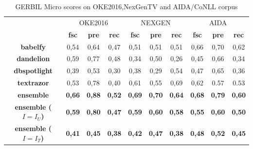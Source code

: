 \documentclass{llncs}
\begin{document}
\begin{table}
      \centering
      \setlength{\tabcolsep}{5pt}
        \begin{tabular}{c|c|c|c|c|c|c|c|c|c|}
          \multicolumn{1}{c}{ } &
          \multicolumn{3}{|c|}{OKE2016} & 
          \multicolumn{3}{|c|}{NEXGEN} &
          \multicolumn{3}{|c|}{AIDA}\\
           \multicolumn{1}{c|}{ } & \textbf{fsc} & \textbf{pre} & \textbf{rec}
           & \textbf{fsc} & \textbf{pre} & \textbf{rec} & \textbf{fsc} & \textbf{pre} & \textbf{rec} \\ \hline
            \textbf{babelfy}         & 0,54  & 0,64   & 0,47  & 0,51  & 0,51 & 0,51 & 0,66 & 0,70 & 0,62  \\ \hline
            \textbf{dandelion}       & 0,59   & 0,77   & 0,48 & 0,34  & 0,50  & 0,26 & 0,45   & 0,66   & 0,34\\ \hline
            \textbf{dbspotlight}     & 0,39   & 0,53   & 0,30 & 0,38   & 0,29  & 0,54 & 0,47	& 0,65 & 0,36 \\ \hline
            \textbf{textrazor}       & 0,53   & 0,78   & 0,40 & 0,61  & 0,55  & 0,69 & 0,62 & 0.57 & 0.53\\ \hline \hline
            \textbf{ensemble}        & \textbf{0,66}   & \textbf{0,88}   & \textbf{0,52}  & \textbf{0,69} & \textbf{0,70}  & \textbf{0,64} & \textbf{0,68}   & \textbf{0,79}   & \textbf{0,60} \\ \hline
            \textbf{ensemble ($I=I_U$)}        & \textbf{0,59}   & \textbf{0,80}   & \textbf{0,47}  & \textbf{0,59} & \textbf{0,60}  & \textbf{0,58} 
            & \textbf{0,55}   & \textbf{0,60}   & \textbf{0,50} \\ \hline
            \textbf{ensemble ($I=I_T$)}        & \textbf{0,41}   & \textbf{0,45}   & \textbf{0,38}  & \textbf{0,42} & \textbf{0,47}  & \textbf{0,38} 
            & \textbf{0,48}   & \textbf{0,52}   & \textbf{0,45} \\ \hline
        \end{tabular}
    \caption{GERBIL Micro scores on OKE2016,NexGenTV and AIDA/CoNLL corpus}
    \label{linkscores}
\end{table}
\end{document}
